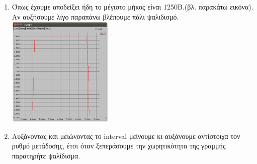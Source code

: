 \documentclass{article}
\begin{document}
\begin{enumerate}
\item
Όπως έχουμε αποδείξει ήδη το μέγιστο μήκος είναι 1250B.(βλ. παρακάτω εικόνα). Αν αυξήσουμε λίγο παραπάνω βλέπουμε πάλι ψαλιδισμό. \\
\includegraphics[witdh=200,height=200]{xgraph1250.png}
\item
Αυξάνοντας και μειώνοντας  το interval  μείνουμε κι αυξάνουμε αντίστοιχα τον ρυθμό μετάδοσης, έτσι όταν ξεπεράσουμε την χωρητικότητα της γραμμής παρατηρήτε ψαλίδισμα.
\\

\end{enumerate}
\end{document}
